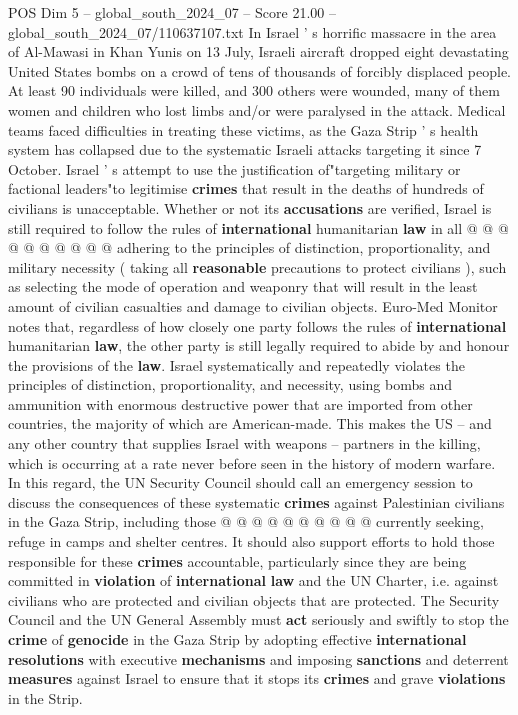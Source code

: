 \begin{textsample}{POS Dim 5 – global\_south\_2024\_07 – Score 21.00 – global\_south\_2024\_07/110637107.txt}
In Israel ' s horrific massacre in the area of Al-Mawasi in Khan Yunis on 13 July, Israeli aircraft dropped eight devastating United States bombs on a crowd of tens of thousands of forcibly displaced people.
At least 90 individuals were killed, and 300 others were wounded, many of them women and children who lost limbs and/or were paralysed in the attack.
Medical teams faced difficulties in treating these victims, as the Gaza Strip ' s health system has collapsed due to the systematic Israeli attacks targeting it since 7 October.
Israel ' s attempt to use the justification of"targeting military or factional leaders"to legitimise \textbf{crimes} that result in the deaths of hundreds of civilians is unacceptable.
Whether or not its \textbf{accusations} are verified, Israel is still required to follow the rules of \textbf{international} humanitarian \textbf{law} in all @ @ @ @ @ @ @ @ @ @ adhering to the principles of distinction, proportionality, and military necessity ( taking all \textbf{reasonable} precautions to protect civilians ), such as selecting the mode of operation and weaponry that will result in the least amount of civilian casualties and damage to civilian objects.
Euro-Med Monitor notes that, regardless of how closely one party follows the rules of \textbf{international} humanitarian \textbf{law}, the other party is still legally required to abide by and honour the provisions of the \textbf{law}.
Israel systematically and repeatedly violates the principles of distinction, proportionality, and necessity, using bombs and ammunition with enormous destructive power that are imported from other countries, the majority of which are American-made.
This makes the US -- and any other country that supplies Israel with weapons -- partners in the killing, which is occurring at a rate never before seen in the history of modern warfare.
In this regard, the UN Security Council should call an emergency session to discuss the consequences of these systematic \textbf{crimes} against Palestinian civilians in the Gaza Strip, including those @ @ @ @ @ @ @ @ @ @ currently seeking, refuge in camps and shelter centres.
It should also support efforts to hold those responsible for these \textbf{crimes} accountable, particularly since they are being committed in \textbf{violation} of \textbf{international} \textbf{law} and the UN Charter, i.e. against civilians who are protected and civilian objects that are protected.
The Security Council and the UN General Assembly must \textbf{act} seriously and swiftly to stop the \textbf{crime} of \textbf{genocide} in the Gaza Strip by adopting effective \textbf{international} \textbf{resolutions} with executive \textbf{mechanisms} and imposing \textbf{sanctions} and deterrent \textbf{measures} against Israel to ensure that it stops its \textbf{crimes} and grave \textbf{violations} in the Strip.

\end{textsample}
